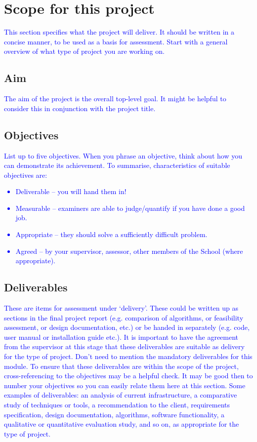 \documentclass[acmtog, nonacm]{acmart}
\begin{document}
\section{Scope for this project}
\textcolor{blue}{This section specifies what the project will deliver. It should be written in a concise manner, to be used as a basis for assessment. Start with a general overview of what type of project you are working on.}

\subsection{Aim}
\textcolor{blue}{The aim of the project is the overall top-level goal. It might be helpful to consider this in conjunction with the project title.}

\subsection{Objectives}
\textcolor{blue}{List up to five objectives. When you phrase an objective, think about how you can demonstrate its achievement.
To summarise, characteristics of suitable objectives are: 
\begin{itemize}
    \item Deliverable -- you will hand them in! 
    \item Measurable -- examiners are able to judge/quantify if you have done a good job.
    \item Appropriate -- they should solve a sufficiently difficult problem.
    \item Agreed – by your supervisor, assessor, other members of the School (where appropriate).
\end{itemize}
}
\subsection{Deliverables}
\textcolor{blue}{These are items for assessment under ‘delivery’. 
These could be written up as sections in the final project report (e.g. comparison of algorithms, or feasibility assessment, or design documentation, etc.) or be handed in separately (e.g. code, user manual or installation guide etc.). It is important to have the agreement from the supervisor at this stage that these deliverables are suitable as delivery for the type of project. 
Don't need to mention the mandatory deliverables for this module. 
To ensure that these deliverables are within the scope of the project, cross-referencing to the objectives may be a helpful check. 
It may be good then to number your objectives so you can easily relate them here at this section. 
Some examples of deliverables: an analysis of current infrastructure, a comparative study of techniques or tools, a recommendation to the client, requirements specification, design documentation, algorithms, software functionality, a qualitative or quantitative evaluation study, and so on, as appropriate for the type of project.}
\end{document}
